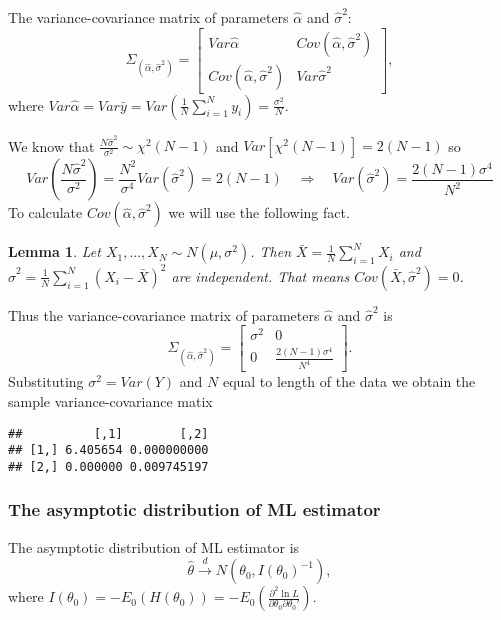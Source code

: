 \documentclass[12pt, a4paper]{article}\usepackage[]{graphicx}\usepackage[]{color}
\makeatletter
\newenvironment{kframe}{%
 \def\at@end@of@kframe{}%
 \ifinner\ifhmode%
  \def\at@end@of@kframe{\end{minipage}}%
  \begin{minipage}{\columnwidth}%
 \fi\fi%
 \def\FrameCommand##1{\hskip\@totalleftmargin \hskip-\fboxsep
 \colorbox{shadecolor}{##1}\hskip-\fboxsep
     \hskip-\linewidth \hskip-\@totalleftmargin \hskip\columnwidth}%
 \MakeFramed {\advance\hsize-\width
   \@totalleftmargin\z@ \linewidth\hsize
   \@setminipage}}%
 {\par\unskip\endMakeFramed%
 \at@end@of@kframe}
\newenvironment{knitrout}{}{} %
\newtheorem{lemma}{Lemma}
\makeatother
\begin{document}
The variance-covariance matrix of parameters $\hat{\alpha}$ and $\hat{\sigma}^{2}$:
\[
  \Sigma_{(\hat{\alpha},\hat{\sigma}^{2})}=
  \begin{bmatrix}  
    Var\hat{\alpha} & Cov(\hat{\alpha},\hat{\sigma}^{2})\\
    Cov(\hat{\alpha},\hat{\sigma}^{2}) & Var\hat{\sigma}^{2}
  \end{bmatrix},
\]
where $ Var\hat{\alpha}=Var\bar{y}=Var\left(\frac{1}{N}\sum^{N}_{i=1}y_{i}\right)=\frac{\sigma^{2}}{N} $.

We know that $\frac{N\hat{\sigma}^{2}}{\sigma^{2}}\sim\chi^{2}(N-1)$ and $Var[\chi^{2}(N-1)]=2(N-1)$ so
\[
Var\left(\frac{N\hat{\sigma}^{2}}{\sigma^{2}}\right)=\frac{N^2}{\sigma^{4}}Var(\hat{\sigma}^{2})=2(N-1)
\quad \Rightarrow \quad
Var(\hat{\sigma}^{2})=\frac{2(N-1)\sigma^{4}}{N^{2}}
\]
To calculate $Cov(\hat{\alpha},\hat{\sigma}^{2})$ we will use the following fact.
%
\begin{lemma}
Let $X_{1},...,X_{N}\sim N(\mu,\sigma^{2})$.
Then $\bar{X}=\frac{1}{N}\sum_{i=1}^{N}X_{i}$ and $\hat{\sigma}^{2}=\frac{1}{N}\sum_{i=1}^{N}(X_i-\bar{X})^{2}$ are independent. 
That means $Cov(\bar{X},\hat{\sigma}^{2})=0$.
\end{lemma}
%
Thus the variance-covariance matrix of parameters $\hat{\alpha}$ and $\hat{\sigma}^{2}$ is
\[
  \Sigma_{(\hat{\alpha},\hat{\sigma}^{2})}=
  \begin{bmatrix}  
    \sigma^{2} & 0\\
    0 & \frac{2(N-1)\sigma^{4}}{N^{4}}
  \end{bmatrix}.
\]
Substituting $\sigma^2 = Var(Y)$ and $N$ equal to length of the data we obtain the sample variance-covariance matix 
\begin{knitrout}
\color{fgcolor}\begin{kframe}
\begin{verbatim}
##          [,1]        [,2]
## [1,] 6.405654 0.000000000
## [2,] 0.000000 0.009745197
\end{verbatim}
\end{kframe}
\end{knitrout}



\subsubsection{The asymptotic distribution of ML estimator}

The asymptotic distribution of ML estimator is
\[\hat{\theta}\xrightarrow[]{d}N(\theta_0, I(\theta_0)^{-1}),\]
where $I(\theta_{0}) = -E_0(H(\theta_{0})) = -E_0\left(\frac{\partial^{2}\ln{L}}{\partial\theta_{0}\partial\theta_{0}'}\right)$.
\end{document}
